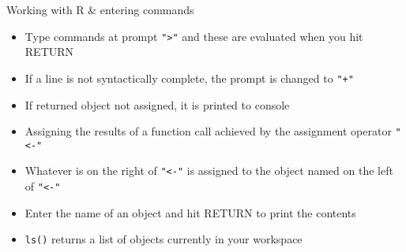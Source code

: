 \documentclass[10pt,ignorenonframetext,compress, aspectratio=169]{beamer}
\providecommand{\tightlist}{%
  \setlength{\itemsep}{0pt}\setlength{\parskip}{0pt}}
\begin{document}
\begin{frame}[fragile]{Working with R \& entering commands}

\begin{itemize}
\tightlist
\item
  Type commands at prompt \texttt{"\textgreater{}"} and these are
  evaluated when you hit RETURN
\item
  If a line is not syntactically complete, the prompt is changed to
  \texttt{"+"}
\item
  If returned object not assigned, it is printed to console
\item
  Assigning the results of a function call achieved by the assignment
  operator \texttt{"\textless{}-"}
\item
  Whatever is on the right of \texttt{"\textless{}-"} is assigned to the
  object named on the left of \texttt{"\textless{}-"}
\item
  Enter the name of an object and hit RETURN to print the contents
\item
  \texttt{ls()} returns a list of objects currently in your workspace
\end{itemize}

\end{frame}
\end{document}
